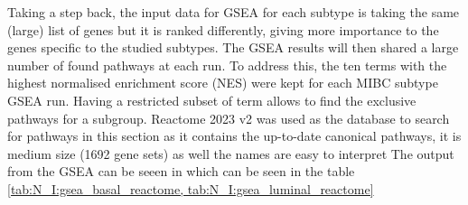 Taking a step back, the input data for GSEA for each subtype is taking the same (large) list of genes but it is ranked differently, giving more importance to the genes specific to the studied subtypes. The GSEA results will then shared a large number of found pathways at each run. To address this, the ten terms with the highest normalised enrichment score (NES) were kept for each MIBC subtype GSEA run. Having a restricted subset of term allows to find the exclusive pathways for a subgroup. Reactome 2023 v2 was used as the database to search for pathways in this section as it contains the up-to-date canonical pathways, it is medium size (1692 gene sets) as well the names are easy to interpret The output from the GSEA can be seeen in which can be seen in the table \cref{tab:N_I:gsea_basal_reactome, tab:N_I:gsea_luminal_reactome}

